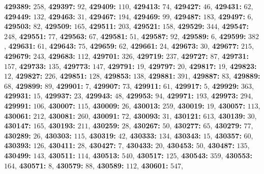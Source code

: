\textsf{\bfseries 429389:} $258$, \textsf{\bfseries 429397:} $92$, \textsf{\bfseries 429409:} $110$, \textsf{\bfseries 429413:} $74$, \textsf{\bfseries 429427:} $46$, \textsf{\bfseries 429431:} $62$, \textsf{\bfseries 429449:} $132$, \textsf{\bfseries 429463:} $31$, \textsf{\bfseries 429467:} $194$, \textsf{\bfseries 429469:} $99$, \textsf{\bfseries 429487:} $183$, \textsf{\bfseries 429497:} $6$, \textsf{\bfseries 429503:} $82$, \textsf{\bfseries 429509:} $165$, \textsf{\bfseries 429511:} $203$, \textsf{\bfseries 429521:} $158$, \textsf{\bfseries 429529:} $344$, \textsf{\bfseries 429547:} $248$, \textsf{\bfseries 429551:} $77$, \textsf{\bfseries 429563:} $67$, \textsf{\bfseries 429581:} $51$, \textsf{\bfseries 429587:} $92$, \textsf{\bfseries 429589:} $6$, \textsf{\bfseries 429599:} $382$, \textsf{\bfseries 429631:} $61$, \textsf{\bfseries 429643:} $75$, \textsf{\bfseries 429659:} $62$, \textsf{\bfseries 429661:} $24$, \textsf{\bfseries 429673:} $30$, \textsf{\bfseries 429677:} $215$, \textsf{\bfseries 429679:} $243$, \textsf{\bfseries 429683:} $112$, \textsf{\bfseries 429701:} $326$, \textsf{\bfseries 429719:} $237$, \textsf{\bfseries 429727:} $87$, \textsf{\bfseries 429731:} $157$, \textsf{\bfseries 429733:} $135$, \textsf{\bfseries 429773:} $147$, \textsf{\bfseries 429791:} $19$, \textsf{\bfseries 429797:} $20$, \textsf{\bfseries 429817:} $19$, \textsf{\bfseries 429823:} $12$, \textsf{\bfseries 429827:} $226$, \textsf{\bfseries 429851:} $128$, \textsf{\bfseries 429853:} $138$, \textsf{\bfseries 429881:} $391$, \textsf{\bfseries 429887:} $83$, \textsf{\bfseries 429889:} $68$, \textsf{\bfseries 429899:} $89$, \textsf{\bfseries 429901:} $7$, \textsf{\bfseries 429907:} $73$, \textsf{\bfseries 429911:} $61$, \textsf{\bfseries 429917:} $5$, \textsf{\bfseries 429929:} $363$, \textsf{\bfseries 429931:} $15$, \textsf{\bfseries 429937:} $23$, \textsf{\bfseries 429943:} $48$, \textsf{\bfseries 429953:} $94$, \textsf{\bfseries 429971:} $193$, \textsf{\bfseries 429973:} $294$, \textsf{\bfseries 429991:} $106$, \textsf{\bfseries 430007:} $115$, \textsf{\bfseries 430009:} $26$, \textsf{\bfseries 430013:} $259$, \textsf{\bfseries 430019:} $19$, \textsf{\bfseries 430057:} $113$, \textsf{\bfseries 430061:} $212$, \textsf{\bfseries 430081:} $260$, \textsf{\bfseries 430091:} $72$, \textsf{\bfseries 430093:} $31$, \textsf{\bfseries 430121:} $613$, \textsf{\bfseries 430139:} $30$, \textsf{\bfseries 430147:} $165$, \textsf{\bfseries 430193:} $211$, \textsf{\bfseries 430259:} $28$, \textsf{\bfseries 430267:} $50$, \textsf{\bfseries 430277:} $65$, \textsf{\bfseries 430279:} $77$, \textsf{\bfseries 430289:} $26$, \textsf{\bfseries 430303:} $115$, \textsf{\bfseries 430319:} $42$, \textsf{\bfseries 430333:} $134$, \textsf{\bfseries 430343:} $15$, \textsf{\bfseries 430357:} $60$, \textsf{\bfseries 430393:} $126$, \textsf{\bfseries 430411:} $28$, \textsf{\bfseries 430427:} $7$, \textsf{\bfseries 430433:} $20$, \textsf{\bfseries 430453:} $50$, \textsf{\bfseries 430487:} $135$, \textsf{\bfseries 430499:} $143$, \textsf{\bfseries 430511:} $114$, \textsf{\bfseries 430513:} $540$, \textsf{\bfseries 430517:} $125$, \textsf{\bfseries 430543:} $359$, \textsf{\bfseries 430553:} $164$, \textsf{\bfseries 430571:} $8$, \textsf{\bfseries 430579:} $88$, \textsf{\bfseries 430589:} $112$, \textsf{\bfseries 430601:} $547$, 
